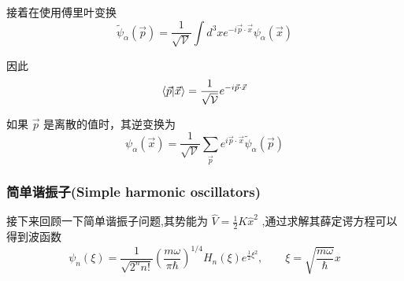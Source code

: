 \documentclass{article}
\begin{document}
接着在使用傅里叶变换
\begin{equation*}
    \tilde{\psi}_\alpha (\vec{p}) = \frac{1}{\sqrt{\mathcal{V}}} \int d^3 x e^{-i\vec{p}\cdot \vec{x}} \psi_\alpha (\vec{x})
\end{equation*}

因此 
\begin{equation*}
    \braket{\vec{p}}{\vec{x}} = \frac{1}{\sqrt{\mathcal{V}}} e^{-i\vec{p} \cdot \vec{x}}
\end{equation*}

如果 $\vec{p}$ 是离散的值时，其逆变换为
\begin{equation*}
    \psi_\alpha (\vec{x}) = \frac{1}{\sqrt{\mathcal{V}}} \sum_{\vec{p}} e^{i\vec{p}\cdot \vec{x}} \tilde{\psi}_\alpha (\vec{p})
\end{equation*}


\subsubsection{简单谐振子(Simple harmonic oscillators)}
接下来回顾一下简单谐振子问题,其势能为 $\displaystyle \hat{V} = \frac{1}{2} K \hat{x}^2$ ,通过求解其薛定谔方程可以得到波函数
\begin{equation*}
    \psi_n(\xi) = \frac{1}{\sqrt{2^n n!}}\left(\frac{m\omega}{\pi \hbar}\right)^{1/4} H_n(\xi) e^{\frac{1}{2}\xi^2} ,\qquad \xi = \sqrt{\frac{m\omega}{\hbar}}x
\end{equation*}
\end{document}
